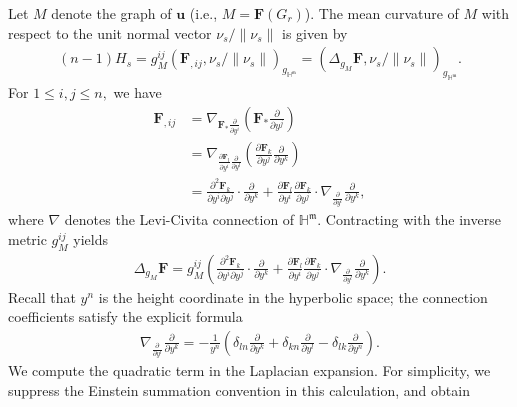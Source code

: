 \documentclass[11pt,reqno]{amsart}
\newcommand{\fm}{\mathfrak{m}}
\renewcommand{\leq}{\leqslant}
\theoremstyle{definition}
\numberwithin{equation}{section}
\begin{document}
Let $M$ denote the graph of $\mathbf{u}$ (i.e., $M = \mathbf{F}(G_r)$). The mean curvature of $M$ with respect to the unit normal vector $\nu_s/\|\nu_s\|$ is given by
\begin{align}\label{eq-Hj}
    (n-1)H_s = g^{ij}_M \left(\mathbf{F}_{, ij}, \nu_s/\|\nu_s\|\right)_{g_{\mathbb{H}^{\fm}}} = \left(\Delta_{g_M}\mathbf{F}, \nu_s/\|\nu_s\|\right)_{g_{\mathbb{H}^{\fm}}}.
\end{align}
For $1\leq i,j\leq n,$ we have
\begin{align}
    \mathbf{F}_{,ij} &= \nabla_{\mathbf{F}_* \frac{\partial}{\partial y^i}}\left(\mathbf{F}_* \frac{\partial}{\partial y^j}\right)\\
    &=\nabla_{\frac{\partial \mathbf{F}_l}{\partial y^i}\frac{\partial}{\partial y^l}}\left(\frac{\partial \mathbf{F}_k}{\partial y^j}\frac{\partial}{\partial y^k}\right) \\
    &=\frac{\partial^2 \mathbf{F}_k}{\partial y^i \partial y^j}\cdot\frac{\partial}{\partial y^k} +\frac{\partial \mathbf{F}_l}{\partial y^i}\frac{\partial \mathbf{F}_k}{\partial y^j} 
    \cdot \nabla_{\frac{\partial}{\partial y^l}}\frac{\partial}{\partial y^k},
\end{align}
where $\nabla$ denotes the Levi-Civita connection of $\mathbb{H}^{\fm}$. 
Contracting with the inverse metric $g_M^{ij}$ yields
\begin{align}
    \Delta_{g_M} \mathbf{F} = g_M^{ij}\left(\frac{\partial^2 \mathbf{F}_k}{\partial y^i \partial y^j}\cdot\frac{\partial}{\partial y^k} +\frac{\partial \mathbf{F}_l}{\partial y^i}\frac{\partial \mathbf{F}_k}{\partial y^j} 
    \cdot \nabla_{\frac{\partial}{\partial y^l}}\frac{\partial}{\partial y^k} \right).
\end{align}
Recall that $y^{n}$ is the height coordinate in the hyperbolic space; the connection coefficients satisfy the explicit formula
\begin{align}
    \nabla_{\frac{\partial}{\partial y^l}}\frac{\partial}{\partial y^k} = -\frac{1}{y^{n}}\left(\delta_{ln} 
    \frac{\partial}{\partial y^k} +\delta_{k n} 
    \frac{\partial}{\partial y^l}-\delta_{l k} 
    \frac{\partial}{\partial y^{n}}\right).
\end{align}
We compute the quadratic term in the Laplacian expansion. For simplicity, we suppress the Einstein summation convention in this calculation, and obtain
\end{document}
